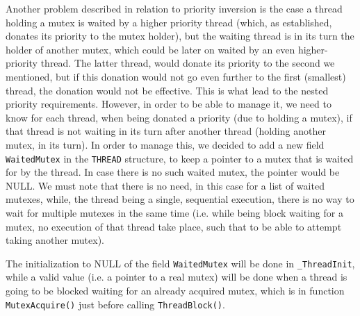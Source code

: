 Another problem described in relation to priority inversion is the case a thread holding a mutex is waited by a higher priority thread (which, as established, donates its priority to the mutex holder), but the waiting thread is in its turn the holder of another mutex, which could be later on waited by an even higher-priority thread. The latter thread, would donate its priority to the second we mentioned, but if this donation would not go even further to the first (smallest) thread, the donation would not be effective. This is what lead to the nested priority requirements. However, in order to be able to manage it, we need to know for each thread, when being donated a priority (due to holding a mutex), if that thread is not waiting in its turn after another thread (holding another mutex, in its turn). In order to manage this, we decided to add a new field \lstinline|WaitedMutex| in the \lstinline|THREAD| structure, to keep a pointer to a mutex that is waited for by the thread. In case there is no such waited mutex, the pointer would be NULL. We must note that there is no need, in this case for a list of waited mutexes, while, the thread being a single, sequential execution, there is no way to wait for multiple mutexes in the same time (i.e. while being block waiting for a mutex, no execution of that thread take place, such that to be able to attempt taking another mutex). 

The initialization to NULL of the field \lstinline|WaitedMutex| will be done in \lstinline|_ThreadInit|, while a valid value (i.e. a pointer to a real mutex) will be done when a thread is going to be blocked waiting for an already acquired mutex, which is in function \lstinline|MutexAcquire()| just before calling \lstinline|ThreadBlock()|.

